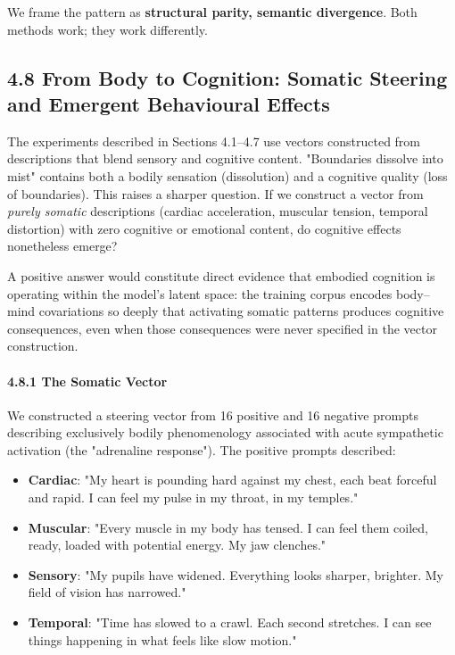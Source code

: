\documentclass[11pt,a4paper]{article}
\begin{document}
We frame the pattern as \textbf{structural parity, semantic divergence}. Both methods work; they work differently.

\subsection*{4.8 From Body to Cognition: Somatic Steering and Emergent Behavioural Effects}

The experiments described in Sections 4.1--4.7 use vectors constructed from descriptions that blend sensory and cognitive content. "Boundaries dissolve into mist" contains both a bodily sensation (dissolution) and a cognitive quality (loss of boundaries). This raises a sharper question. If we construct a vector from \emph{purely somatic} descriptions (cardiac acceleration, muscular tension, temporal distortion) with zero cognitive or emotional content, do cognitive effects nonetheless emerge?

A positive answer would constitute direct evidence that embodied cognition is operating within the model's latent space: the training corpus encodes body--mind covariations so deeply that activating somatic patterns produces cognitive consequences, even when those consequences were never specified in the vector construction.

\paragraph{4.8.1 The Somatic Vector}

We constructed a steering vector from 16 positive and 16 negative prompts describing exclusively bodily phenomenology associated with acute sympathetic activation (the "adrenaline response"). The positive prompts described:

\begin{itemize}[leftmargin=*]
  \item \textbf{Cardiac}: "My heart is pounding hard against my chest, each beat forceful and rapid. I can feel my pulse in my throat, in my temples."
  \item \textbf{Muscular}: "Every muscle in my body has tensed. I can feel them coiled, ready, loaded with potential energy. My jaw clenches."
  \item \textbf{Sensory}: "My pupils have widened. Everything looks sharper, brighter. My field of vision has narrowed."
  \item \textbf{Temporal}: "Time has slowed to a crawl. Each second stretches. I can see things happening in what feels like slow motion."
\end{itemize}
\end{document}
